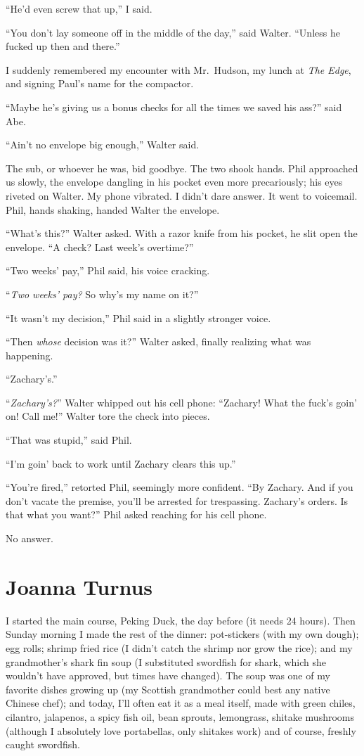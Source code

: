 ``He'd even screw that up,'' I said.

``You don't lay someone off in the middle of the day,'' said Walter.
``Unless he fucked up then and there.''

I suddenly remembered my encounter with Mr.~Hudson, my lunch at
\emph{The Edge}, and signing Paul's name for the compactor.

``Maybe he's giving us a bonus checks for all the times we saved his
ass?'' said Abe.

``Ain't no envelope big enough,'' Walter said.

The sub, or whoever he was, bid goodbye. The two shook hands. Phil
approached us slowly, the envelope dangling in his pocket even more
precariously; his eyes riveted on Walter. My phone vibrated. I didn't
dare answer. It went to voicemail. Phil, hands shaking, handed Walter
the envelope.

``What's this?'' Walter asked. With a razor knife from his pocket, he
slit open the envelope. ``A check? Last week's overtime?''

``Two weeks' pay,'' Phil said, his voice cracking.

``\emph{Two weeks' pay?} So why's my name on it?''

``It wasn't my decision,'' Phil said in a slightly stronger voice.

``Then \emph{whose} decision was it?'' Walter asked, finally realizing
what was happening.

``Zachary's.''

``\emph{Zachary's?}'' Walter whipped out his cell phone: ``Zachary! What
the fuck's goin' on! Call me!'' Walter tore the check into pieces.

``That was stupid,'' said Phil.

``I'm goin' back to work until Zachary clears this up.''

``You're fired,'' retorted Phil, seemingly more confident. ``By Zachary.
And if you don't vacate the premise, you'll be arrested for trespassing.
Zachary's orders. Is that what you want?'' Phil asked reaching for his
cell phone.

No answer.

\chapter{Joanna Turnus}

\titlemark

I started the main course, Peking Duck, the day before (it needs 24
hours). Then Sunday morning I made the rest of the dinner: pot-stickers
(with my own dough); egg rolls; shrimp fried rice (I didn't catch the
shrimp nor grow the rice); and my grandmother's shark fin soup (I
substituted swordfish for shark, which she wouldn't have approved, but
times have changed). The soup was one of my favorite dishes growing up
(my Scottish grandmother could best any native Chinese chef); and today,
I'll often eat it as a meal itself, made with green chiles, cilantro,
jalapenos, a spicy fish oil, bean sprouts, lemongrass, shitake mushrooms
(although I absolutely love portabellas, only shitakes work) and of
course, freshly caught swordfish.

